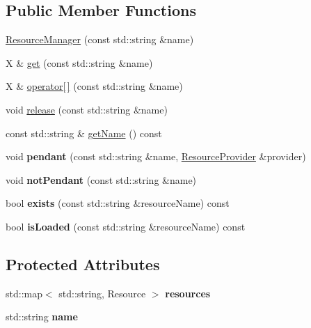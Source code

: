 \subsection*{Public Member Functions}
\begin{DoxyCompactItemize}
\item 
\hyperlink{classzt_1_1_resource_manager_aa0973ae6bf2db29a560064101f7e3aa2}{Resource\+Manager} (const std\+::string \&name)
\item 
X \& \hyperlink{classzt_1_1_resource_manager_a5db7d69f549152f521d3e6dc8dceab9d}{get} (const std\+::string \&name)
\item 
X \& \hyperlink{classzt_1_1_resource_manager_a4eeebff68670999944d5a663bbf2c9ed}{operator\mbox{[}$\,$\mbox{]}} (const std\+::string \&name)
\item 
void \hyperlink{classzt_1_1_resource_manager_ad89a189ae9a569688fba24a053e2cd21}{release} (const std\+::string \&name)
\item 
const std\+::string \& \hyperlink{classzt_1_1_resource_manager_a53eff2997bb98a45bce592be5a8cfd89}{get\+Name} () const
\item 
\mbox{\label{classzt_1_1_resource_manager_ad9b2235e6ca7136905fc0e9831ca8d19}} 
void {\bfseries pendant} (const std\+::string \&name, \hyperlink{classzt_1_1_resource_provider}{Resource\+Provider} \&provider)
\item 
\mbox{\label{classzt_1_1_resource_manager_a52ede9719df15de6396783071b73fed4}} 
void {\bfseries not\+Pendant} (const std\+::string \&name)
\item 
\mbox{\label{classzt_1_1_resource_manager_af37584a0c96930f860ea0fc0bfdd11a4}} 
bool {\bfseries exists} (const std\+::string \&resource\+Name) const
\item 
\mbox{\label{classzt_1_1_resource_manager_a2c4a7986157152012fc7792f9faedf69}} 
bool {\bfseries is\+Loaded} (const std\+::string \&resource\+Name) const
\end{DoxyCompactItemize}
\subsection*{Protected Attributes}
\begin{DoxyCompactItemize}
\item 
\mbox{\label{classzt_1_1_resource_manager_a78d09009c29b7358e6edf927a82221cf}} 
std\+::map$<$ std\+::string, Resource $>$ {\bfseries resources}
\item 
\mbox{\label{classzt_1_1_resource_manager_a2bcd33206c69c33054fef8446b78801f}} 
std\+::string {\bfseries name}
\end{DoxyCompactItemize}


